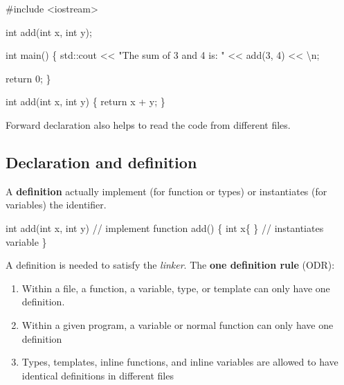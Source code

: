 \documentclass[
  letterpaper,
  DIV=11,
  numbers=noendperiod]{scrreprt}
\newenvironment{Shaded}{\begin{snugshade}}{\end{snugshade}}
\newcommand{\CommentTok}[1]{\textcolor[rgb]{0.37,0.37,0.37}{#1}}
\newcommand{\ControlFlowTok}[1]{\textcolor[rgb]{0.00,0.23,0.31}{#1}}
\newcommand{\DecValTok}[1]{\textcolor[rgb]{0.68,0.00,0.00}{#1}}
\newcommand{\ErrorTok}[1]{\textcolor[rgb]{0.68,0.00,0.00}{#1}}
\newcommand{\FunctionTok}[1]{\textcolor[rgb]{0.28,0.35,0.67}{#1}}
\newcommand{\NormalTok}[1]{\textcolor[rgb]{0.00,0.23,0.31}{#1}}
\newcommand{\SpecialCharTok}[1]{\textcolor[rgb]{0.37,0.37,0.37}{#1}}
\newcommand{\StringTok}[1]{\textcolor[rgb]{0.13,0.47,0.30}{#1}}
\providecommand{\tightlist}{%
  \setlength{\itemsep}{0pt}\setlength{\parskip}{0pt}}\usepackage{longtable,booktabs,array}
\begin{document}
\begin{Shaded}
\begin{Highlighting}[]
\CommentTok{\#include \textless{}iostream\textgreater{}}

\NormalTok{int }\FunctionTok{add}\NormalTok{(int x, int y);}

\NormalTok{int }\FunctionTok{main}\NormalTok{()}
\NormalTok{\{}
\NormalTok{    std}\SpecialCharTok{::}\NormalTok{cout }\SpecialCharTok{\textless{}}\ErrorTok{\textless{}} \StringTok{"The sum of 3 and 4 is: "} \SpecialCharTok{\textless{}}\ErrorTok{\textless{}} \FunctionTok{add}\NormalTok{(}\DecValTok{3}\NormalTok{, }\DecValTok{4}\NormalTok{) }\SpecialCharTok{\textless{}}\ErrorTok{\textless{}} \StringTok{\textquotesingle{}}\SpecialCharTok{\textbackslash{}n}\StringTok{\textquotesingle{}}\NormalTok{;}

\NormalTok{    return }\DecValTok{0}\NormalTok{;}
\NormalTok{\}}

\NormalTok{int }\FunctionTok{add}\NormalTok{(int x, int y)}
\NormalTok{\{}
\NormalTok{    return x }\SpecialCharTok{+}\NormalTok{ y;}
\NormalTok{\}}
\end{Highlighting}
\end{Shaded}

Forward declaration also helps to read the code from different files.

\hypertarget{declaration-and-definition}{%
\subsection{Declaration and
definition}\label{declaration-and-definition}}

A \textbf{definition} actually implement (for function or types) or
instantiates (for variables) the identifier.

\begin{Shaded}
\begin{Highlighting}[]
\NormalTok{int }\FunctionTok{add}\NormalTok{(int x, int y)    }\SpecialCharTok{/}\ErrorTok{/}\NormalTok{ implement }\ControlFlowTok{function} \FunctionTok{add}\NormalTok{()}
\NormalTok{\{}
\NormalTok{  int x\{ \}  }\SpecialCharTok{/}\ErrorTok{/}\NormalTok{ instantiates variable}
\NormalTok{\}}
\end{Highlighting}
\end{Shaded}

A definition is needed to satisfy the \emph{linker}. The \textbf{one
definition rule} (ODR):

\begin{enumerate}
\def\labelenumi{\arabic{enumi}.}
\tightlist
\item
  Within a file, a function, a variable, type, or template can only have
  one definition.
\item
  Within a given program, a variable or normal function can only have
  one definition
\item
  Types, templates, inline functions, and inline variables are allowed
  to have identical definitions in different files
\end{enumerate}
\end{document}
